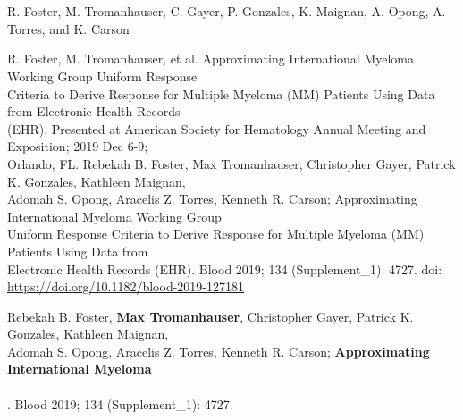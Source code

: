 \documentclass{resume} %
\begin{document}
\hspace*{1mm}{\bf Approximating International Myeloma Working Group Uniform Response Criteria to Derive} \\
\hspace*{1mm}{\bf Response for Multiple Myeloma (MM) Patients Using Data from Electronic Health
Records (EHR)} \\
\hspace*{1mm}R. Foster, M. Tromanhauser, C. Gayer, P. Gonzales, K. Maignan, A. Opong, A. Torres, and K. Carson \\
\hspace*{1mm}{\em Poster presented at the American Society for Hematology Annual Meeting and Exposition
2019, Orlando, FL.}

\iffalse
\hspace*{1mm}R. Foster, M. Tromanhauser, et al. Approximating International Myeloma Working Group Uniform Response \\
\hspace*{1mm}Criteria to Derive Response for Multiple Myeloma (MM) Patients Using Data from Electronic Health Records\\
\hspace*{1mm}(EHR). Presented at American Society for Hematology Annual Meeting and Exposition; 2019 Dec 6-9; \\
\hspace*{1mm}Orlando, FL.
\hspace*{1mm}Rebekah B. Foster, Max Tromanhauser, Christopher Gayer, Patrick K. Gonzales, Kathleen Maignan, \\
\hspace*{2mm}Adomah S. Opong, Aracelis Z. Torres, Kenneth R. Carson; Approximating International Myeloma Working Group \\
\hspace*{2mm}Uniform Response Criteria to Derive Response for Multiple Myeloma (MM) Patients Using Data from \\
\hspace*{2mm}Electronic Health Records (EHR). Blood 2019; 134 (Supplement\_1): 4727. doi: \\
\hspace*{2mm}\href{https://doi.org/10.1182/blood-2019-127181}{https://doi.org/10.1182/blood-2019-127181}

\hspace*{1mm}Rebekah B. Foster, {\bf Max Tromanhauser}, Christopher Gayer, Patrick K. Gonzales, Kathleen Maignan, \\
\hspace*{3mm}Adomah S. Opong, Aracelis Z. Torres, Kenneth R. Carson; {\bf Approximating International Myeloma } \\
\hspace*{3mm}{\bf Working Group Uniform Response Criteria to Derive Response for Multiple Myeloma (MM)} \\
\hspace*{3mm}{\bf Patients Using Data from Electronic Health Records (EHR)}. Blood 2019; 134 (Supplement\_1): 4727.
\end{document}
